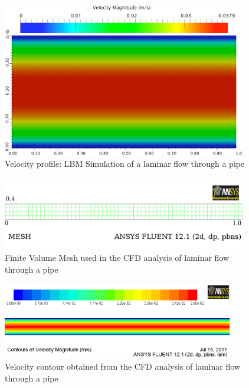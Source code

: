 \begin{figure}[h]
\centering
\includegraphics[width=0.95\textwidth]{LBM_Poiseuille}
\caption{Velocity profile: LBM Simulation of a laminar flow through a pipe}
\label{fig:LBM_Poiseuille}
\end{figure}

\begin{figure}[h]
\centering
\includegraphics[width=0.95\textwidth]{CFD_Mesh}
\caption{Finite Volume Mesh used in the CFD analysis of laminar flow through a 
pipe}
\label{fig:mesh}
\end{figure}


\begin{figure}[h]
\centering
\includegraphics[width=0.9\textwidth]{CFD_Poiseuille}
\caption{Velocity contour obtained from the CFD analysis of laminar flow 
through a pipe}
\label{fig:cont}
\end{figure}



